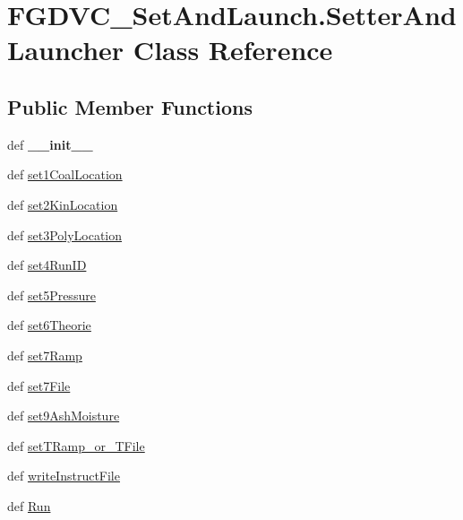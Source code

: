 \hypertarget{classFGDVC__SetAndLaunch_1_1SetterAndLauncher}{\section{\-F\-G\-D\-V\-C\-\_\-\-Set\-And\-Launch.\-Setter\-And\-Launcher \-Class \-Reference}
\label{classFGDVC__SetAndLaunch_1_1SetterAndLauncher}
}
\subsection*{\-Public \-Member \-Functions}
\begin{DoxyCompactItemize}
\item 
\hypertarget{classFGDVC__SetAndLaunch_1_1SetterAndLauncher_a8b91135b4f532768acc8fe5bd25ba657}{def {\bfseries \-\_\-\-\_\-init\-\_\-\-\_\-}}\label{classFGDVC__SetAndLaunch_1_1SetterAndLauncher_a8b91135b4f532768acc8fe5bd25ba657}

\item 
def \hyperlink{classFGDVC__SetAndLaunch_1_1SetterAndLauncher_a9be4d15cc143d24e54c19f19b3d67371}{set1\-Coal\-Location}
\item 
def \hyperlink{classFGDVC__SetAndLaunch_1_1SetterAndLauncher_af8d54375297836bc2af2b0584a9f8768}{set2\-Kin\-Location}
\item 
def \hyperlink{classFGDVC__SetAndLaunch_1_1SetterAndLauncher_aea7c95546b67bda52bf56f87b3644ef8}{set3\-Poly\-Location}
\item 
def \hyperlink{classFGDVC__SetAndLaunch_1_1SetterAndLauncher_aefc48598a3bc166370d2b403b443aec9}{set4\-Run\-I\-D}
\item 
def \hyperlink{classFGDVC__SetAndLaunch_1_1SetterAndLauncher_a0914fe6299f8ade1d7e17ee2483531cf}{set5\-Pressure}
\item 
def \hyperlink{classFGDVC__SetAndLaunch_1_1SetterAndLauncher_a116cb38b88fabe2f5bd2a45a1de6fa0b}{set6\-Theorie}
\item 
def \hyperlink{classFGDVC__SetAndLaunch_1_1SetterAndLauncher_a8572e0199ccb02da119c803c31331629}{set7\-Ramp}
\item 
def \hyperlink{classFGDVC__SetAndLaunch_1_1SetterAndLauncher_a85fddc035c436f83a141813db0fa0a4c}{set7\-File}
\item 
def \hyperlink{classFGDVC__SetAndLaunch_1_1SetterAndLauncher_aa7bc83c2215281993ec9cd513ddf3072}{set9\-Ash\-Moisture}
\item 
def \hyperlink{classFGDVC__SetAndLaunch_1_1SetterAndLauncher_a4066f0415203250464e57deb29d4cd0e}{set\-T\-Ramp\-\_\-or\-\_\-\-T\-File}
\item 
def \hyperlink{classFGDVC__SetAndLaunch_1_1SetterAndLauncher_a964768c47177ef9604fd7e4270fb1439}{write\-Instruct\-File}
\item 
def \hyperlink{classFGDVC__SetAndLaunch_1_1SetterAndLauncher_abca5677dd8d72bdf6116882a8f5a95d6}{\-Run}
\end{DoxyCompactItemize}
